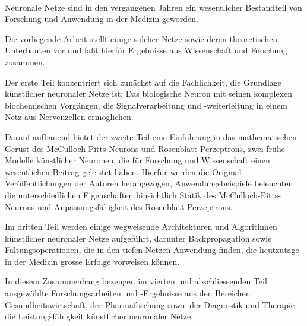 \kurzfassung

\paragraph*{}

Neuronale Netze sind in den vergangenen Jahren ein wesentlicher Bestandteil von Forschung und Anwendung in der Medizin geworden.

Die vorliegende Arbeit stellt einige solcher Netze sowie deren theoretischen Unterbauten vor und faßt hierfür Ergebnisse aus Wissenschaft und Forschung zusammen.

Der erste Teil konzentriert sich zunächst auf die Fachlichkeit, die Grundlage künstlicher neuronaler Netze ist: Das biologische Neuron mit seinen komplexen biochemischen Vorgängen, die Signalverarbeitung und -weiterleitung in einem Netz aus Nervenzellen ermöglichen.

Darauf aufbauend bietet der zweite Teil eine Einführung in das mathematischen Gerüst des McCulloch-Pitts-Neurons und Rosenblatt-Perzeptrons, zwei frühe Modelle künstlicher Neuronen, die für Forschung und Wissenschaft einen wesentlichen Beitrag geleistet haben.
Hierfür werden die Original-Veröffentlichungen der Autoren herangezogen, Anwendungsbeispiele beleuchten die unterschiedlichen Eigenschaften hinsichtlich Statik des McCulloch-Pitts-Neurons und Anpassungsfähigkeit des Rosenblatt-Perzeptrons.

Im dritten Teil werden einige wegweisende Architekturen und Algorithmen künstlicher neuronaler Netze aufgeführt, darunter Backpropagation sowie Faltungsoperationen, die in den tiefen Netzen Anwendung finden, die heutzutage in der Medizin grosse Erfolge vorweisen können.

In diesem Zusammenhang bezeugen im vierten und abschliessenden Teil ausgewählte Forschungsarbeiten und -Ergebnisse aus den Bereichen Gesundheitswirtschaft, der Pharmafoschung sowie der Diagnostik und Therapie die Leistungsfähigkeit künstlicher neuronaler Netze.
